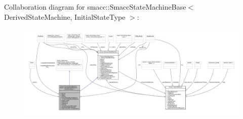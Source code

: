Collaboration diagram for smacc\+:\+:Smacc\+State\+Machine\+Base$<$ Derived\+State\+Machine, Initial\+State\+Type $>$\+:
\nopagebreak
\begin{figure}[H]
\begin{center}
\leavevmode
\includegraphics[width=350pt]{structsmacc_1_1SmaccStateMachineBase__coll__graph}
\end{center}
\end{figure}
